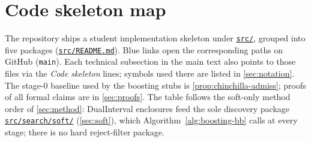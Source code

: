 \documentclass[11pt]{article}
\newcommand{\repoBlob}{https://github.com/krichelj/ByteBoost-Shape-Constrained-Boosted-SR/blob/main/}
\newcommand{\repoTree}{https://github.com/krichelj/ByteBoost-Shape-Constrained-Boosted-SR/tree/main/}
\newcommand{\pyFile}[1]{\href{\repoBlob#1}{\nolinkurl{#1}}}
\newcommand{\pyDir}[1]{\href{\repoTree#1}{\nolinkurl{#1/}}}
\theoremstyle{plain}
\theoremstyle{remark}
\begin{document}

\section{Code skeleton map}\label{sec:code-map}
The repository ships a student implementation skeleton under \pyDir{src}, grouped into five packages (\pyFile{src/README.md}).
Blue links open the corresponding paths on GitHub (\texttt{main}).
Each technical subsection in the main text also points to those files via the \textit{Code skeleton} lines; symbols used there are listed in \cref{sec:notation}.
The stage-0 baseline used by the boosting stubs is \cref{prop:chinchilla-admiss}; proofs of all formal claims are in \cref{sec:proofs}.
The table follows the soft-only method order of \cref{sec:method}: DualInterval enclosures feed the sole discovery package \pyDir{src/search/soft} (\cref{sec:soft}), which Algorithm~\ref{alg:boosting-bb} calls at every stage; there is no hard reject-filter package.
\end{document}
